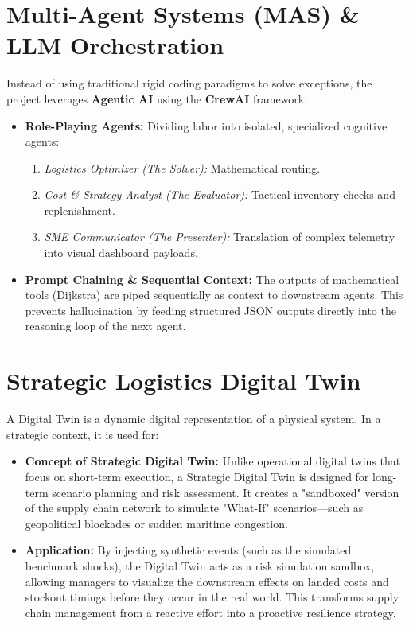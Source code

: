 \section{Multi-Agent Systems (MAS) \& LLM Orchestration}
Instead of using traditional rigid coding paradigms to solve exceptions, the project leverages \textbf{Agentic AI} using the \textbf{CrewAI} framework:

\begin{itemize}
    \item \textbf{Role-Playing Agents:} Dividing labor into isolated, specialized cognitive agents:
    \begin{enumerate}
        \item \textit{Logistics Optimizer (The Solver):} Mathematical routing.
        \item \textit{Cost \& Strategy Analyst (The Evaluator):} Tactical inventory checks and replenishment.
        \item \textit{SME Communicator (The Presenter):} Translation of complex telemetry into visual dashboard payloads.
    \end{enumerate}
    \item \textbf{Prompt Chaining \& Sequential Context:} The outputs of mathematical tools (Dijkstra) are piped sequentially as context to downstream agents. This prevents hallucination by feeding structured JSON outputs directly into the reasoning loop of the next agent.
\end{itemize}

\section{Strategic Logistics Digital Twin}
A Digital Twin is a dynamic digital representation of a physical system. In a strategic context, it is used for:

\begin{itemize}
    \item \textbf{Concept of Strategic Digital Twin:} Unlike operational digital twins that focus on short-term execution, a Strategic Digital Twin is designed for long-term scenario planning and risk assessment. It creates a "sandboxed" version of the supply chain network to simulate "What-If" scenarios—such as geopolitical blockades or sudden maritime congestion.
    \item \textbf{Application:} By injecting synthetic events (such as the simulated benchmark shocks), the Digital Twin acts as a risk simulation sandbox, allowing managers to visualize the downstream effects on landed costs and stockout timings before they occur in the real world. This transforms supply chain management from a reactive effort into a proactive resilience strategy.
\end{itemize}

